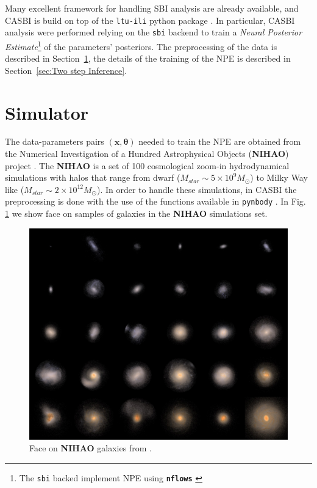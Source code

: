 Many excellent framework for handling SBI analysis are already available, and CASBI is build on top of the \texttt{ltu-ili} python package \cite{hoLtUILIAllinOneFramework2024}. In particular, CASBI analysis were performed relying on the \texttt{sbi} backend \cite{tejero-canteroSbiToolkitSimulationbased2020} to train a \textit{Neural Posterior Estimate}\footnote{The \texttt{sbi} backed implement NPE using \textbf{\texttt{nflows}} \cite{durkanNflowsNormalizingFlows2020}} of the parameters' posteriors. The preprocessing of the data is described in Section~\ref{sec:NIHAO}, the details of the training of the NPE is described in Section~\ref{sec:Two step Inference}.


\section{Simulator}\label{sec:NIHAO}
The data-parameters pairs $(\mathbf{x}, \boldsymbol{\theta})$ needed to train the NPE are obtained from the Numerical Investigation of a Hundred Astrophysical Objects (\textbf{NIHAO}) project \cite{wangNIHAOProjectReproducing2015}. The \textbf{NIHAO} is a set of 100 cosmological zoom-in hydrodynamical simulations with halos that range from dwarf ($M_{star} \sim 5 \times 10^9 M_\odot$) to Milky Way like ($M_{star} \sim 2 \times 10^{12} M_\odot$). In order to handle these simulations, in CASBI the preprocessing is done with the use of the functions available in \texttt{pynbody} \cite{pontzenPynbodyNBodySPH2013}. In Fig. \ref{fig:NIHAO} we show face on samples of galaxies in the \textbf{NIHAO} simulations set.

\begin{figure}[ht]
    \centering
    \includegraphics[width=1\textwidth]{./figure/NIHAO.jpeg}
    \caption{Face on \textbf{NIHAO} galaxies from \cite{wangNIHAOProjectReproducing2015}.}
    \label{fig:NIHAO}
\end{figure}

